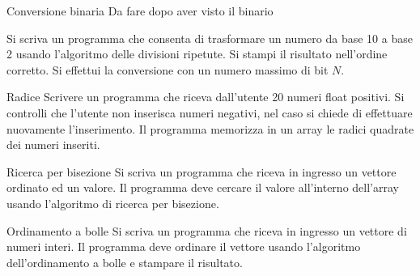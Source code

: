 \documentclass[aspectratio=169, handout]{beamer}
\begin{document}
\begin{frame}{Conversione binaria}
    \alert{Da fare dopo aver visto il binario}

Si scriva un programma che consenta di trasformare un numero da base 10 a base 2 usando l'algoritmo delle divisioni ripetute. Si stampi il risultato nell'ordine corretto. Si effettui la conversione con un numero massimo di bit $N$.
\end{frame}

\begin{frame}{Radice}
Scrivere un programma che riceva dall'utente 20 numeri float positivi.
Si controlli che l'utente non inserisca numeri negativi, nel caso si chiede di effettuare nuovamente l'inserimento.
Il programma memorizza in un array le radici quadrate dei numeri inseriti.
\end{frame}

\begin{frame}{Ricerca per bisezione}
Si scriva un programma che riceva in ingresso un vettore ordinato ed un valore.
Il programma deve cercare il valore all'interno dell'array usando l'algoritmo di ricerca per bisezione.
\end{frame}

\begin{frame}{Ordinamento a bolle}
Si scriva un programma che riceva in ingresso un vettore di numeri interi.
Il programma deve ordinare il vettore usando l'algoritmo dell'ordinamento a bolle e stampare il risultato.
\end{frame}
\end{document}
